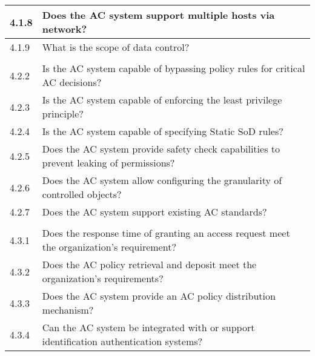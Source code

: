 {\begin{table}[h]
\begin{tabular}{l|l}
		4.1.8              & \llap{\textbullet} Does the AC system support multiple hosts via network?                                             \\ \hline
		4.1.9              & \llap{\textbullet} What is the scope of data control?                                                                 \\
		\hline \rowcolor{lightgray} \multicolumn{2}{l}{Enforcement Properties}                                                                     \\ \hline
		4.2.2              & \llap{\textbullet} Is the AC system capable of bypassing policy rules for critical AC decisions?                      \\ \hline
		4.2.3              & \llap{\textbullet} Is the AC system capable of enforcing the least privilege principle?                               \\ \hline
		4.2.4              & \llap{\textbullet} Is the AC system capable of specifying Static SoD rules?                                           \\ \hline
		4.2.5              & \llap{\textbullet} Does the AC system provide safety check capabilities to prevent leaking of permissions?            \\ \hline
		4.2.6              & \llap{\textbullet} Does the AC system allow configuring the granularity of controlled objects?                        \\ \hline
		4.2.7              & \llap{\textbullet} Does the AC system support existing AC standards?                                                  \\
		\hline \rowcolor{lightgray} \multicolumn{2}{l}{Performance Properties}                                                                     \\ \hline
		4.3.1              & \llap{\textbullet} Does the response time of granting an access request meet the organization’s requirement?          \\ \hline
		4.3.2              & \llap{\textbullet} Does the AC policy retrieval and deposit meet the organization’s requirements?                     \\ \hline
		4.3.3              & \llap{\textbullet} Does the AC system provide an AC policy distribution mechanism?                                    \\ \hline
		4.3.4              & \llap{\textbullet} Can the AC system be integrated with or support identification authentication systems?             \\

\end{tabular}
\end{table}}
